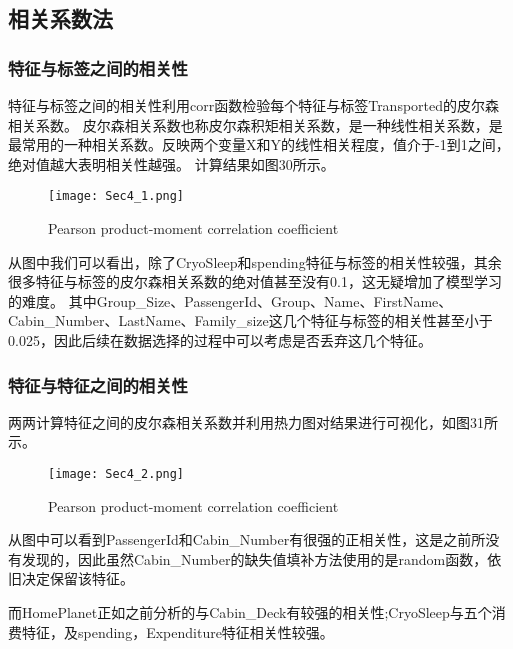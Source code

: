 \documentclass[../main.tex]{subfiles}
\begin{document}
    \subsection{相关系数法}

        \subsubsection{特征与标签之间的相关性}

            特征与标签之间的相关性利用corr函数检验每个特征与标签Transported的皮尔森相关系数。
            皮尔森相关系数也称皮尔森积矩相关系数，是一种线性相关系数，是最常用的一种相关系数。反映两个变量X和Y的线性相关程度，值介于-1到1之间，绝对值越大表明相关性越强。
            计算结果如图30所示。

            \begin{figure}[H]
                \centering
                \texttt{[image: Sec4\_1.png]}
                \caption{Pearson product-moment correlation coefficient}
            \end{figure}

            从图中我们可以看出，除了CryoSleep和spending特征与标签的相关性较强，其余很多特征与标签的皮尔森相关系数的绝对值甚至没有0.1，这无疑增加了模型学习的难度。
            其中Group\_Size、PassengerId、Group、Name、FirstName、Cabin\_Number、LastName、Family\_size这几个特征与标签的相关性甚至小于0.025，因此后续在数据选择的过程中可以考虑是否丢弃这几个特征。

        \subsubsection{特征与特征之间的相关性}

            两两计算特征之间的皮尔森相关系数并利用热力图对结果进行可视化，如图31所示。

            \begin{figure}[H]
                \centering
                \texttt{[image: Sec4\_2.png]}
                \caption{Pearson product-moment correlation coefficient}
            \end{figure}

            从图中可以看到PassengerId和Cabin\_Number有很强的正相关性，这是之前所没有发现的，因此虽然Cabin\_Number的缺失值填补方法使用的是random函数，依旧决定保留该特征。

            而HomePlanet正如之前分析的与Cabin\_Deck有较强的相关性;CryoSleep与五个消费特征，及spending，Expenditure特征相关性较强。
\end{document}
